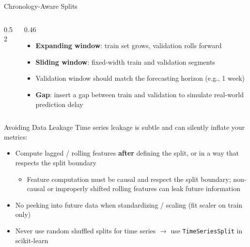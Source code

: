 \documentclass[11pt,compress,t,notes=noshow, xcolor=table]{beamer}
\begin{document}
\begin{vbframe}{Chronology-Aware Splits}
\begin{columns}[T]
\begin{column}{0.52\textwidth}
  \end{column}
  \begin{column}{0.46\textwidth}
    \small
    \begin{itemize}
      \item \textbf{Expanding window}: train set grows, validation rolls forward
      \item \textbf{Sliding window}: fixed-width train and validation segments
      \item Validation window should match the forecasting horizon (e.g., 1 week)
      \item \textbf{Gap}: insert a gap between train and validation to simulate real-world prediction delay
    \end{itemize}
  \end{column}
  \end{columns}
\end{vbframe}

\begin{vbframe}{Avoiding Data Leakage}
\vfill
Time series leakage is subtle and can silently inflate your metrics:
\vfill
  \begin{itemize}
    \item Compute lagged / rolling features \textbf{after} defining the split, or in a way that respects the split boundary
    \begin{itemize}
        \item Feature computation must be causal and respect the split boundary; non-causal or improperly shifted rolling features can leak future information
    \end{itemize}
    \item No peeking into future data when standardizing / scaling (fit scaler on train only)
    \item Never use random shuffled splits for time series $\rightarrow$ use \texttt{TimeSeriesSplit} in scikit-learn
  \end{itemize}
\vfill
\end{vbframe}
\end{document}
